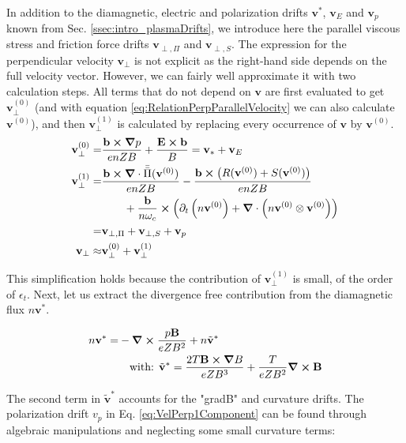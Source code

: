 In addition to the diamagnetic, electric and polarization drifts $\mathbf{v}^*$, $\mathbf{v}_E$ and $\mathbf{v}_{p}$known from Sec. \ref{ssec:intro_plasmaDrifts}, we introduce here the parallel viscous stress and friction force drifts $\mathbf{v}_{\perp,\Pi}$ and $\mathbf{v}_{\perp,S}$. The expression for the perpendicular velocity $\mathbf{v}_\perp$ is not explicit as the right-hand side depends on the full velocity vector. However, we can fairly well approximate it with two calculation steps. All terms that do not depend on $\textbf{v}$ are first evaluated to get $\mathbf{v}_\perp^{(0)}$ (and with equation \ref{eq:RelationPerpParallelVelocity} we can also calculate $\mathbf{v}^{(0)}$), and then $\mathbf{v}_\perp^{(1)}$ is calculated by replacing every occurrence of $\mathbf{v}$ by $\mathbf{v}^{(0)}$. 
\begin{align}
	\mathbf{v}_\perp^{(0)} =& \frac{\mathbf{b}\cross\grad p}{enZB} + \frac{\mathbf{E}\cross\mathbf{b}}{B} = \mathbf{v}_* + \mathbf{v}_E \label{eq:VelPerp0Component} \\	
	\mathbf{v}_\perp^{(1)} =& \frac{\mathbf{b}\cross\grad\cdot\bar{\bar{\Pi}}(\mathbf{v}^{(0)})}{enZB} - \frac{\mathbf{b}\cross\left(R(\mathbf{v}^{(0)})+S(\mathbf{v}^{(0)})\right)}{enZB} \nonumber\\ & \qquad + \frac{\mathbf{b}}{n\omega_c} \cross \left(\partial_t \left(n\mathbf{v}^{(0)}\right) + \grad\cdot\left(n\mathbf{v}^{(0)}\otimes\mathbf{v}^{(0)}\right)\right) \nonumber \\
	=& \mathbf{v}_{\perp,\Pi} + \mathbf{v}_{\perp,S} + \mathbf{v}_{p} \label{eq:VelPerp1Component} \\
	\mathbf{v}_\perp \approx& \mathbf{v}_\perp^{(0)} + \mathbf{v}_\perp^{(1)}
\end{align}

This simplification holds because the contribution of $\mathbf{v}_\perp^{(1)}$ is small, of the order of $\epsilon_t$. Next, let us extract the divergence free contribution from the diamagnetic flux $n\mathbf{v}^*$.

\begin{align}
	\label{eq:definitionDiamagneticDrift}
	n\mathbf{v}^* =& -\grad \cross \frac{p\mathbf{B}}{eZB^2} + n\tilde{\mathbf{v}}^* \nonumber\\
	& \quad\text{with: } \tilde{\mathbf{v}}^* = \frac{2T\mathbf{B}\cross\grad B}{eZB^3} + \frac{T}{eZB^2}\grad\cross\mathbf{B}
\end{align}

The second term in $\tilde{\mathbf{v}}^*$ accounts for the "gradB" and curvature drifts. The polarization drift $v_{p}$ in Eq. \ref{eq:VelPerp1Component} can be found through algebraic manipulations and neglecting some small curvature terms:

